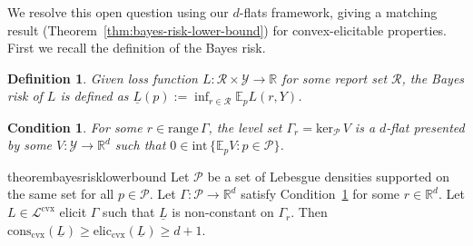 \documentclass[11pt]{article} %
\newcommand{\Comments}{1}
\newcommand{\mytodo}[2]{\ifnum\Comments=1%
	\todo[linecolor=#1!80!black,backgroundcolor=#1,bordercolor=#1!80!black]{#2}\fi}
\newcommand{\jessiet}[1]{\mytodo{purple!20!white}{JF: #1}}
\newcommand{\btw}[1]{}%
\newcommand{\reals}{\mathbb{R}}
\newcommand{\simplex}{\Delta_\Y}
\newcommand{\interior}{\mathrm{int}\,}
\newcommand{\eliccvx}{\mathrm{elic}_\mathrm{cvx}}
\newcommand{\conscvx}{\mathrm{cons}_\mathrm{cvx}}
\newcommand{\range}{\mathrm{range}\,}
\newcommand{\zeros}[1]{\mathrm{ker}_\P\,#1}
\newcommand{\E}{\mathbb{E}}
\newcommand{\Lcvx}{\mathcal{L}^{\mathrm{cvx}}}
\newcommand{\R}{\mathcal{R}}
\renewcommand{\P}{\mathcal{P}}
\newcommand{\Y}{\mathcal{Y}}
\newcommand{\lbar}{\underline{L}} %
\newcommand{\iden}{\mathrm{iden}}
\newtheorem{definition}{Definition}
\newtheorem{condition}{Condition}
\begin{document}
We resolve this open question using our $d$-flats framework, giving a matching result (Theorem~\ref{thm:bayes-risk-lower-bound}) for convex-elicitable properties.
First we recall the definition of the Bayes risk.

\begin{definition}
  \label{def:bayes-risk}
  Given loss function $L:\R\times\Y \to \reals$ for some report set $\R$, the \emph{Bayes risk} of $L$ is defined as $\lbar(p) := \inf_{r \in \R} \E_pL(r,Y)$.
\end{definition}




\begin{condition}\label{cond:v-interior}
  For some $r\in\range\Gamma$, the level set $\Gamma_r = \zeros{V}$ is a $d$-flat presented by some $V:\Y\to\reals^d$ such that \btw{I think we only need $\Gamma_r \subseteq \zeros{V}$.  I think I'll update the proof at some point to reflect this, since it actually gets a bit easier to follow.} $0\in\interior\{\E_pV : p\in\P\}$.
\end{condition}


\begin{restatable}{theorem}{bayesrisklowerbound}\label{thm:bayes-risk-lower-bound}
  Let $\P$ be a set of Lebesgue densities supported on the same set for all $p \in \P$.
  Let $\Gamma:\P\to\reals^d$ satisfy Condition~\ref{cond:v-interior} for some $r\in\reals^d$.
  Let $L \in \Lcvx$ elicit $\Gamma$ such that $\lbar$ is non-constant on $\Gamma_r$.
  Then $\conscvx(\lbar) \geq \eliccvx(\lbar) \geq d+1$.
\end{restatable}
\end{document}
